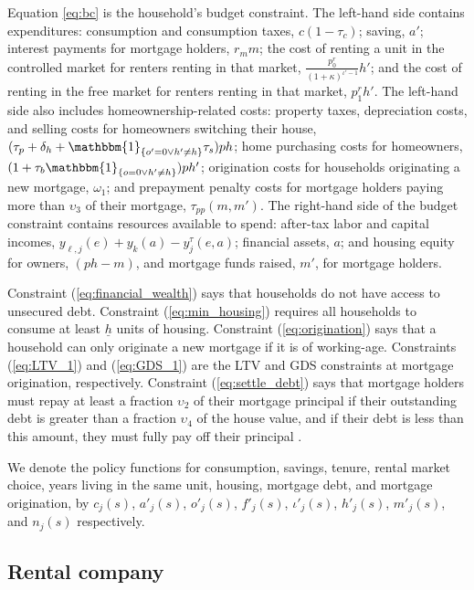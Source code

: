 \documentclass[parskip=full]{article}
\newcommand{\indicator}[1]{\mathbbm{1}_{\left\{ {#1} \right\} }}
\begin{document}
Equation \ref{eq:bc} is the household's budget constraint. The left-hand side contains expenditures: consumption and consumption taxes, $c(1-\tau_{c})$; saving, $a'$; interest payments for mortgage holders, $r_{m}m$; the cost of renting a unit in the controlled market for renters renting in that market, $\frac{p^{r}_{0}}{(1+\kappa)^{\iota'-1}}h'$; and the cost of renting in the free market for renters renting in that market, $p^{r}_{1}h'$. The left-hand side also includes homeownership-related costs: property taxes, depreciation costs, and selling costs for homeowners switching their house, $(\tau_{p}+\delta_{h}+\indicator{o'=0\vee h'\neq h}\tau_{s})ph$; home purchasing costs for homeowners, $(1+\tau_{b}\indicator{o=0\vee h'\neq h})ph'$; origination costs for households originating a new mortgage, $\omega_{1}$; and prepayment penalty costs for mortgage holders paying more than $\upsilon_{3}$ of their mortgage, $\tau_{pp}(m,m')$. The right-hand side of the budget constraint contains resources available to spend: after-tax labor and capital incomes, $y_{\ell,j}(e)+y_{k}(a)-y^{\tau}_{j}(e,a)$; financial assets, $a$; and housing equity for owners, $(ph-m)$, and mortgage funds raised, $m'$, for mortgage holders.

Constraint (\ref{eq:financial_wealth}) says that households do not have access to unsecured debt. Constraint (\ref{eq:min_housing}) requires all households to consume at least $\underline{h}$ units of housing. Constraint (\ref{eq:origination}) says that a household can only originate a new mortgage if it is of working-age. Constraints (\ref{eq:LTV_1}) and (\ref{eq:GDS_1}) are the LTV and GDS constraints at mortgage origination, respectively. Constraint (\ref{eq:settle_debt}) says that mortgage holders must repay at least a fraction $\upsilon_{2}$ of their mortgage principal if their outstanding debt is greater than a fraction $\upsilon_{4}$ of the house value, and if their debt is less than this amount, they must fully pay off their principal .

We denote the policy functions for consumption, savings, tenure, rental market choice, years living in the same unit, housing, mortgage debt, and mortgage origination, by $c_{j}(s)$, $a'_{j}(s)$, $o'_{j}(s)$, $f'_{j}(s)$, $\iota'_{j}(s)$, $h'_{j}(s)$, $m'_{j}(s)$, and $n_{j}(s)$ respectively.

\subsection{Rental company}\label{sec:rental_company}
\end{document}
